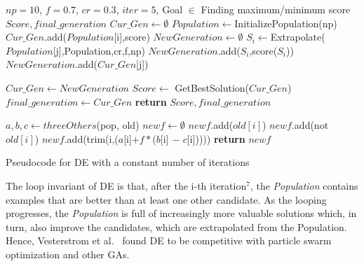 \documentclass[sigconf]{acmart}
\renewcommand{\algorithmicrequire}{\textbf{Input:}}
\renewcommand{\algorithmicensure}{\textbf{Output:}}
\theoremstyle{break}
\begin{document}
\renewcommand{\algorithmicrequire}{\textbf{Input:}}
\renewcommand{\algorithmicensure}{\textbf{Output:}}
\begin{algorithm}
  
    \begin{algorithmic}[1]
    \Require $np=10$, $f=0.7$, $cr=0.3$, $iter=5$, Goal $\in$ Finding maximum/minimum score
    \Ensure $Score, final\_generation$
        \State  $Cur\_Gen \leftarrow \emptyset$
        \State $Population \leftarrow $InitializePopulation(np)
            \State $Cur\_Gen$.add($Population$[i],score)
        \EndFor
            \State $NewGeneration \leftarrow \emptyset$
                \State $S_i \leftarrow $Extrapolate($Population$[j],Population,cr,f,np)
                    \State $NewGeneration$.add($S_i$,score($S_i$))
                \Else
                    \State $NewGeneration$.add($Cur\_Gen$[j])
                \EndIf
            
            \EndFor
            \State  $Cur\_Gen \leftarrow NewGeneration$
        \EndFor
        \State $Score \leftarrow$ GetBestSolution($Cur\_Gen$)
        \State  $final\_generation \leftarrow Cur\_Gen$
        \State \textbf{return} $Score, final\_generation$
    \EndFunction

        \State $a,b,c \leftarrow threeOthers$(pop, old)
        \State $newf \leftarrow \emptyset$
                \State $newf$.add($old[i]$)
            \Else
                    \State $newf$.add(not $old[i]$)
                \Else 
                    \State $newf$.add(trim(i,($a$[i]+$f\ast$($b$[i] $-$ $c$[i]))))
                \EndIf
            \EndIf
        \EndFor
        \State \textbf{return} $newf$ 
    \EndFunction
    \caption{Pseudocode for DE with a constant number of iterations}
    \end{algorithmic}
\end{algorithm}

The loop invariant of DE is that, after the i-th iteration$^7$, the \textit{Population}
contains examples that are better than at least one other candidate.
As the looping progresses, the \textit{Population} is full of increasingly more valuable solutions
which, in turn, also improve the candidates, which are extrapolated from the Population.
Hence, Vesterstrom et al.~\cite{vesterstrom2004comparative} found DE to be
competitive with particle swarm optimization and other GAs.
\end{document}
